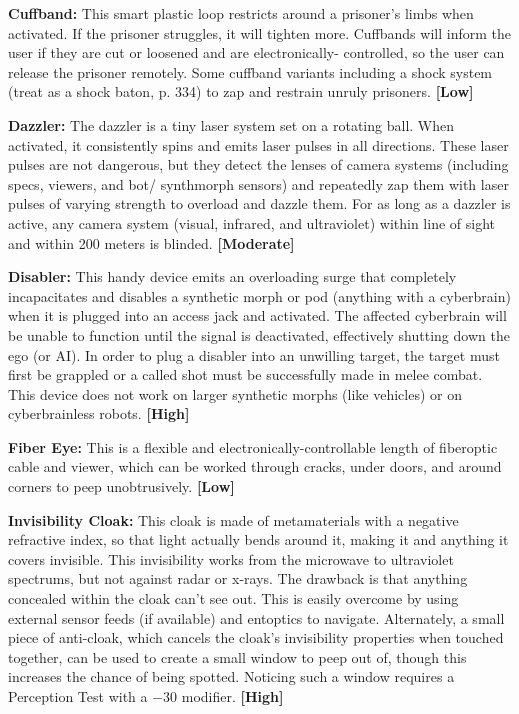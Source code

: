 \textbf{Cuffband:} This smart plastic loop restricts around a prisoner’s limbs when activated. If the prisoner struggles, it will tighten more. Cuffbands will inform the user if they are cut or loosened and are electronically- controlled, so the user can release the prisoner remotely. Some cuffband variants including a shock system (treat as a shock baton, p. 334) to zap and restrain unruly prisoners. \textbf{[Low]}

\textbf{Dazzler:} The dazzler is a tiny laser system set on a rotating ball. When activated, it consistently spins and emits laser pulses in all directions. These laser pulses are not dangerous, but they detect the lenses of camera systems (including specs, viewers, and bot/ synthmorph sensors) and repeatedly zap them with laser pulses of varying strength to overload and dazzle them. For as long as a dazzler is active, any camera system (visual, infrared, and ultraviolet) within line of sight and within 200 meters is blinded. \textbf{[Moderate]}

\textbf{Disabler:} This handy device emits an overloading surge that completely incapacitates and disables a synthetic morph or pod (anything with a cyberbrain) when it is plugged into an access jack and activated. The affected cyberbrain will be unable to function until the signal is deactivated, effectively shutting down the ego (or AI). In order to plug a disabler into an unwilling target, the target must first be grappled or a called shot must be successfully made in melee combat. This device does not work on larger synthetic morphs (like vehicles) or on cyberbrainless robots. \textbf{[High]}

\textbf{Fiber Eye:} This is a flexible and electronically-controllable length of fiberoptic cable and viewer, which can be worked through cracks, under doors, and around corners to peep unobtrusively. \textbf{[Low]}

\textbf{Invisibility Cloak:} This cloak is made of metamaterials with a negative refractive index, so that light actually bends around it, making it and anything it covers invisible. This invisibility works from the microwave to ultraviolet spectrums, but not against radar or x-rays. The drawback is that anything concealed within the cloak can’t see out. This is easily overcome by using external sensor feeds (if available) and entoptics to navigate. Alternately, a small piece of anti-cloak, which cancels the cloak’s invisibility properties when touched together, can be used to create a small window to peep out of, though this increases the chance of being spotted. Noticing such a window requires a Perception Test with a $-$30 modifier. \textbf{[High]}

